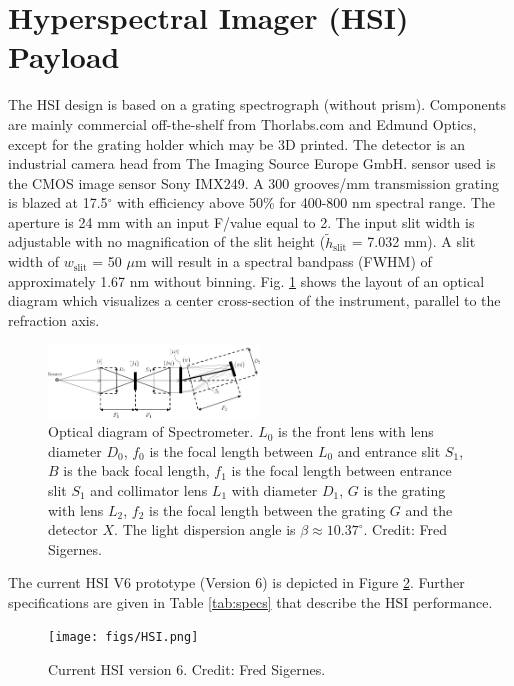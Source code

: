 \section{Hyperspectral Imager (HSI) Payload} \label{sec:hsi}

The HSI design is based on a grating spectrograph (without prism). Components are mainly commercial off-the-shelf from Thorlabs.com and Edmund Optics, except for the grating holder which may be 3D printed. The detector is an industrial camera head from The Imaging Source Europe GmbH. sensor used is the CMOS image sensor Sony IMX249. A 300 grooves/mm transmission grating is blazed at 17.5$^{\circ}$ with efficiency above 50\% for 400-800 nm spectral range. The aperture is 24 mm with an input F/value equal to 2. The input slit width is adjustable with no magnification of the slit height ($\tilde{h}_{\text{slit}}$ = 7.032 mm). A slit width of $w_{\text{slit}}$ = 50 $\mu$m will result in a spectral bandpass (FWHM) of approximately 1.67 nm without binning. Fig. \ref{fig:optics} shows the layout of an optical diagram which visualizes a center cross-section of the instrument, parallel to the refraction axis.
\begin{figure}[htbp]
  \centering
      \includegraphics[width=0.5\textwidth]{figs/optics.png}
  \caption{Optical diagram of Spectrometer. $L_0$ is the front lens with lens diameter $D_0$, $f_0$ is the focal length between $L_0$ and entrance slit $S_1$, $B$ is the back focal length, $f_1$ is the focal length between entrance slit $S_1$ and collimator lens $L_1$ with diameter $D_1$, $G$ is the grating with lens $L_2$, $f_2$ is the focal length between the grating $G$ and the detector $X$. The light dispersion angle is $\beta \approx 10.37^{\circ}$. Credit: Fred Sigernes.}
	\label{fig:optics}
\end{figure}
The current HSI V6 prototype (Version 6) is depicted in Figure \ref{fig:hsi}. Further specifications are given in Table \ref{tab:specs} that describe the HSI performance.
\begin{figure}[htbp]
  \centering
      \texttt{[image: figs/HSI.png]}
  \caption{Current HSI version 6. Credit: Fred Sigernes.}
	\label{fig:hsi}
\end{figure}
